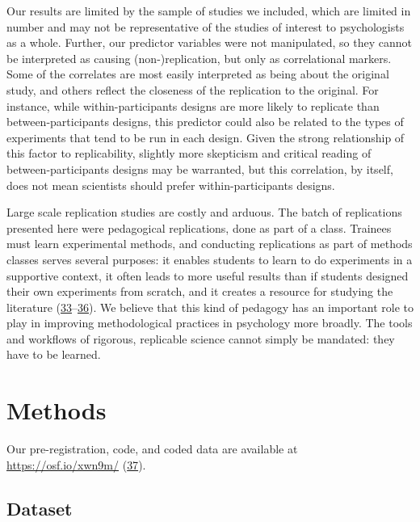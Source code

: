\documentclass[
  english,
  a4paper,
]{article}
\begin{document}
Our results are limited by the sample of studies we included, which are limited in number and may not be representative of the studies of interest to psychologists as a whole. Further, our predictor variables were not manipulated, so they cannot be interpreted as causing (non-)replication, but only as correlational markers. Some of the correlates are most easily interpreted as being about the original study, and others reflect the closeness of the replication to the original. For instance, while within-participants designs are more likely to replicate than between-participants designs, this predictor could also be related to the types of experiments that tend to be run in each design. Given the strong relationship of this factor to replicability, slightly more skepticism and critical reading of between-participants designs may be warranted, but this correlation, by itself, does not mean scientists should prefer within-participants designs.

Large scale replication studies are costly and arduous. The batch of replications presented here were pedagogical replications, done as part of a class. Trainees must learn experimental methods, and conducting replications as part of methods classes serves several purposes: it enables students to learn to do experiments in a supportive context, it often leads to more useful results than if students designed their own experiments from scratch, and it creates a resource for studying the literature (\protect\hyperlink{ref-quintana2021}{33}--\protect\hyperlink{ref-hawkins2018}{36}). We believe that this kind of pedagogy has an important role to play in improving methodological practices in psychology more broadly. The tools and workflows of rigorous, replicable science cannot simply be mandated: they have to be learned.

\hypertarget{methods}{%
\section{Methods}\label{methods}}

Our pre-registration, code, and coded data are available at \url{https://osf.io/xwn9m/} (\protect\hyperlink{ref-osfdata}{37}).

\hypertarget{dataset}{%
\subsection{Dataset}\label{dataset}}
\end{document}

